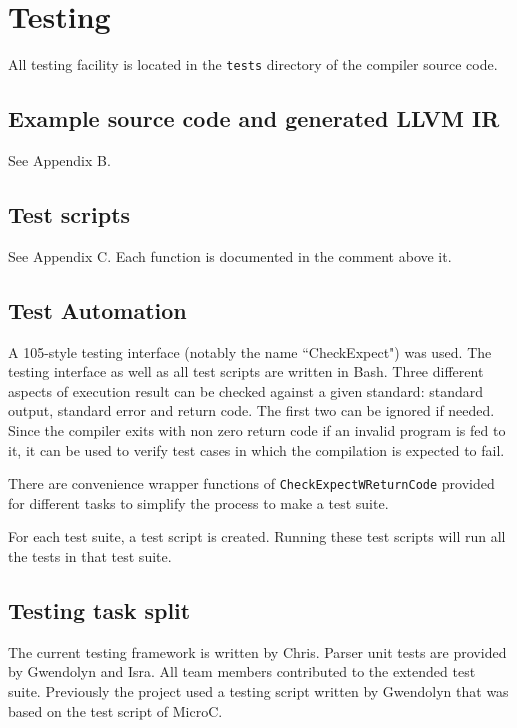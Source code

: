 \section{Testing}

All testing facility is located in the \texttt{tests} directory of the compiler source code.

\subsection{Example source code and generated LLVM IR}

See Appendix B.

\subsection{Test scripts}

See Appendix C. Each function is documented in the comment above it.

\subsection{Test Automation}

A 105-style testing interface (notably the name ``CheckExpect") was used. The testing interface
as well as all test scripts are written in Bash. Three different aspects
of execution result can be checked against a given standard: standard output, standard error and
return code. The first two can be ignored if needed. Since the compiler exits with non zero return
code if an invalid program is fed to it, it can be used to verify test cases in which the
compilation is expected to fail.

There are convenience wrapper functions of \verb|CheckExpectWReturnCode| provided for different
tasks to simplify the process to make a test suite.

For each test suite, a test script is created. Running these test scripts will run all the tests
in that test suite.

\subsection{Testing task split}

The current testing framework is written by Chris. Parser unit tests are provided by Gwendolyn
and Isra. All team members contributed to the extended test suite. Previously the project used
a testing script written by Gwendolyn that was based on the test script of MicroC.
